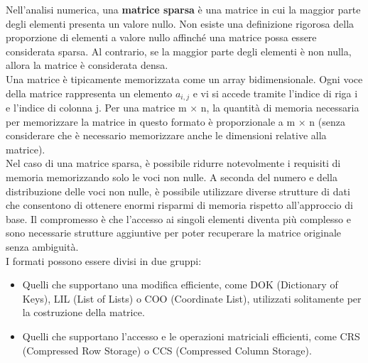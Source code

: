 Nell'analisi numerica, una \textbf{matrice sparsa} è una matrice in cui la maggior parte degli elementi presenta un valore nullo. Non esiste una definizione rigorosa della proporzione di elementi a valore nullo affinché una matrice possa essere considerata sparsa. Al contrario, se la maggior parte degli elementi è non nulla, allora la matrice è considerata densa.
\\
Una matrice è tipicamente memorizzata come un array bidimensionale. Ogni voce della matrice rappresenta un elemento $a_{i,j}$ e vi si accede tramite l'indice di riga i e l'indice di colonna j. Per una matrice m × n, la quantità di memoria necessaria per memorizzare la matrice in questo formato è proporzionale a m × n (senza considerare che è necessario memorizzare anche le dimensioni relative alla matrice).
\\
Nel caso di una matrice sparsa, è possibile ridurre notevolmente i requisiti di memoria memorizzando solo le voci non nulle. A seconda del numero e della distribuzione delle voci non nulle, è possibile utilizzare diverse strutture di dati che consentono di ottenere enormi risparmi di memoria rispetto all'approccio di base. Il compromesso è che l'accesso ai singoli elementi diventa più complesso e sono necessarie strutture aggiuntive per poter recuperare la matrice originale senza ambiguità.
\\
I formati possono essere divisi in due gruppi:
\begin{itemize}
	\item Quelli che supportano una modifica efficiente, come DOK (Dictionary of Keys), LIL (List of Lists) o COO (Coordinate List), utilizzati solitamente per la costruzione della matrice.
	\item Quelli che supportano l'accesso e le operazioni matriciali efficienti, come CRS (Compressed Row Storage) o CCS (Compressed Column Storage).
\end{itemize}
